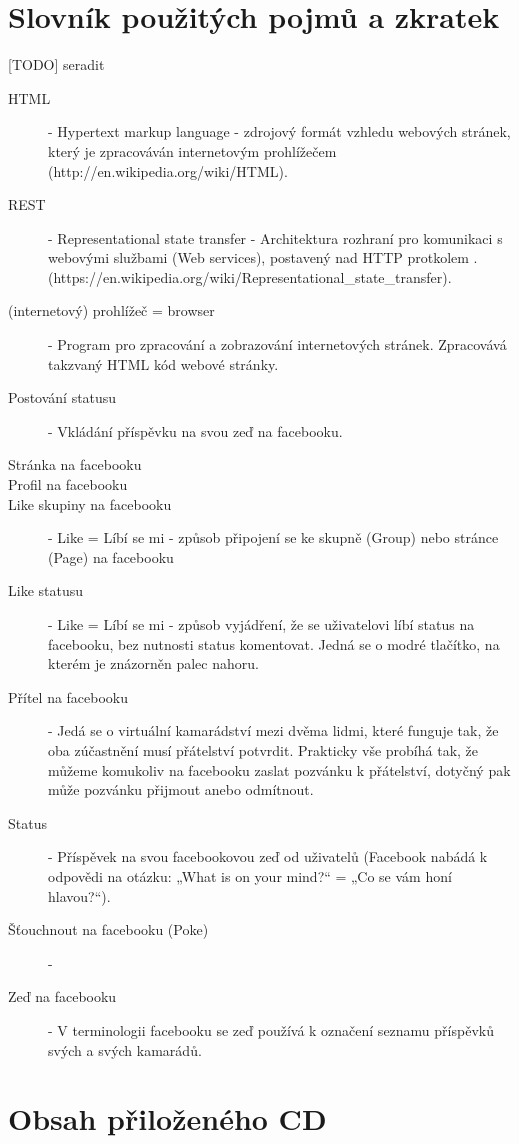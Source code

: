 \documentclass[thesis=M,czech]{FITthesis}[2013/05/10]
\begin{document}
\chapter{Slovník použitých pojmů a zkratek}
[TODO] seradit
\begin{description}
	\item[HTML] - Hypertext markup language - zdrojový formát vzhledu webových stránek, který je zpracováván internetovým prohlížečem
		\newline(http://en.wikipedia.org/wiki/HTML).
	\item[REST] - Representational state transfer - Architektura rozhraní pro komunikaci s webovými službami (Web services), postavený nad HTTP protkolem .
\newline(https://en.wikipedia.org/wiki/Representational\_state\_transfer).
	\item[(internetový) prohlížeč = browser] - Program pro zpracování a zobrazování internetových stránek. Zpracovává takzvaný HTML kód webové stránky.
	\item[Postování statusu] - Vkládání příspěvku na svou zeď na  facebooku.
	\item[Stránka na facebooku]
	\item[Profil na facebooku]
	\item[Like skupiny na facebooku] - Like = Líbí se mi - způsob připojení se ke skupně (Group) nebo stránce (Page) na facebooku
	\item[Like statusu] - Like = Líbí se mi - způsob vyjádření, že se uživatelovi líbí status na facebooku, bez nutnosti status komentovat. Jedná se o modré tlačítko, na kterém je znázorněn palec nahoru.
	\item[Přítel na facebooku] - Jedá se o virtuální kamarádství mezi dvěma lidmi, které funguje tak, že oba zúčastnění musí přátelství potvrdit. Prakticky vše probíhá tak, že můžeme komukoliv na facebooku zaslat pozvánku k přátelství, dotyčný pak může pozvánku přijmout anebo odmítnout.  
	\item[Status] - Příspěvek na svou facebookovou zeď od uživatelů (Facebook nabádá k odpovědi na otázku: „What is on your mind?“ = „Co se vám honí hlavou?“).
	\item[Šťouchnout na facebooku (Poke)] -
	\item[Zeď na facebooku] - V terminologii facebooku se zeď používá k označení seznamu příspěvků svých a svých kamarádů.
\end{description}

\chapter{Obsah přiloženého CD}

\begin{figure}
\end{figure}
\end{document}
